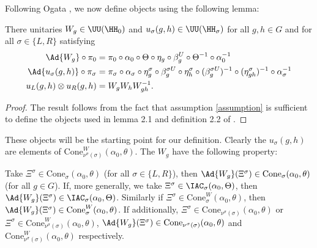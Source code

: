 Following Ogata \cite{Ogata2d}, we now define objects using the following lemma:
\begin{lemma}\label{lem:Definition_W_And_u}
	There unitaries $W_g\in\UU(\HH_0)$ and $u_{\sigma}(g,h)\in\UU(\HH_{\sigma})$ for all $g,h\in G$ and for all $\sigma\in\{L,R\}$ satisfying
	\begin{align}
		\nonumber
		\Ad{W_g}\circ\pi_0&=\pi_0\circ\alpha_0\circ\Theta\circ\eta_g\circ\beta_g^U\circ\Theta^{-1}\circ\alpha_0^{-1}\\
		\Ad{u_\sigma(g,h)}\circ\pi_\sigma&=\pi_\sigma\circ\alpha_\sigma\circ\eta_g^\sigma\circ\beta_g^{\sigma U}\circ\eta_h^{\sigma}\circ(\beta_g^{\sigma U})^{-1}\circ(\eta^\sigma_{gh})^{-1}\circ\alpha_\sigma^{-1}\\
		\nonumber
		u_L(g,h)\otimes u_R(g,h)&=W_gW_hW_{gh}^{-1}.
	\end{align}
\end{lemma}
\begin{proof}
	The result follows from the fact that assumption \ref{assumption} is sufficient to define the objects used in lemma 2.1 and definition 2.2 of \cite{Ogata2d}.
\end{proof}
These objects will be the starting point for our definition. Clearly the $u_\sigma(g,h)$ are elements of $\textrm{Cone}_{\nu^\sigma(\sigma)}^W(\alpha_0,\theta)$. The $W_g$ have the following property:
\begin{lemma}\label{lem:AdjointOverConeIsInCone}
	Take $\Xi^{\sigma}\in\textrm{Cone}_\sigma(\alpha_0,\theta)$ (for all $\sigma\in\{L,R\}$), then $\Ad{W_g}(\Xi^\sigma)\in\textrm{Cone}_\sigma(\alpha_0,\theta)$ (for all $g\in G$). If, more generally, we take $\Xi^\sigma\in\IAC_\sigma(\alpha_0,\Theta)$, then $\Ad{W_g}(\Xi^\sigma)\in\IAC_\sigma(\alpha_0,\Theta)$. Similarly if $\Xi^{\sigma}\in\textrm{Cone}_\sigma^W(\alpha_0,\theta)$, then $\Ad{W_g}(\Xi^\sigma)\in\textrm{Cone}_\sigma^W(\alpha_0,\theta)$. If additionally, $\Xi^{\sigma}\in\textrm{Cone}_{\nu^\sigma(\sigma)}(\alpha_0,\theta)$ or $\Xi^{\sigma}\in\textrm{Cone}_{\nu^\sigma(\sigma)}^W(\alpha_0,\theta)$, $\Ad{W_g}(\Xi^\sigma)\in\textrm{Cone}_{\nu^\sigma(\sigma)}(\alpha_0,\theta)$ and $\textrm{Cone}_{\nu^\sigma(\sigma)}^W(\alpha_0,\theta)$ respectively.
\end{lemma}
